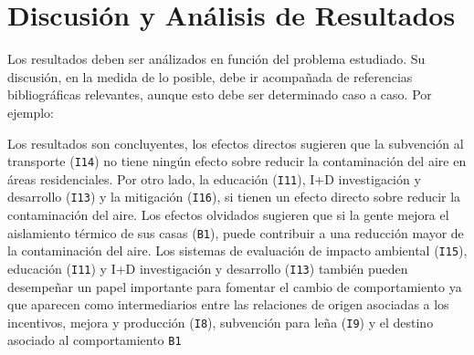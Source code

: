 \chapter{Discusión y Análisis de Resultados}
Los resultados deben ser análizados en función del problema estudiado. Su discusión, en la medida de lo posible, debe ir acompañada de referencias bibliográficas relevantes, aunque esto debe ser determinado caso a caso. Por ejemplo:

Los resultados son concluyentes, los efectos directos sugieren que la subvención al transporte (\texttt{I14}) no tiene ningún efecto sobre reducir la contaminación del aire en áreas residenciales. Por otro lado, la educación (\texttt{I11}), I+D investigación y desarrollo (\texttt{I13}) y la mitigación (\texttt{I16}), si tienen un efecto directo sobre reducir la contaminación del aire. Los efectos olvidados sugieren que si la gente mejora el aislamiento térmico de sus casas (\texttt{B1}), puede contribuir a una reducción mayor de la contaminación del aire. Los sistemas de evaluación de impacto ambiental (\texttt{I15}), educación (\texttt{I11}) y I+D investigación y desarrollo (\texttt{I13}) también pueden desempeñar un papel importante para fomentar el cambio de comportamiento ya que aparecen como intermediarios entre las relaciones de origen asociadas a los incentivos, mejora y producción (\texttt{I8}), subvención para leña (\texttt{I9}) y el destino asociado al comportamiento \texttt{B1}